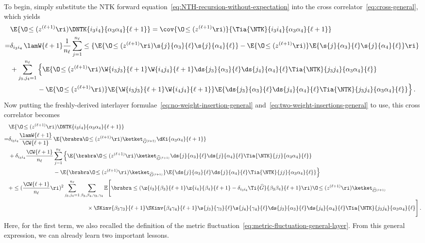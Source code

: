 To begin, simply substitute the NTK forward equation~\eqref{eq:NTH-recursion-without-expectation} into the cross correlator~\eqref{eq:cross-general}, which yields
\begin{align}\label{eq:cross-general-reexpress}
&\E{\O\!\le(z^{(\ell+1)}\ri)\DNTK{i_3i_4}{\alpha_3\alpha_4}{\ell+1}}=\cov{\O\!\le(z^{(\ell+1)}\ri)}{\Tia{\NTK}{i_3i_4}{\alpha_3\alpha_4}{\ell+1}}\, \\
=&\delta_{i_3i_4}\,\lamW{\ell+1}\frac{1}{n_{\ell}}\sum_{j=1}^{n_{\ell}}\le\{\E{\O\!\le(z^{(\ell+1)}\ri)\s{j}{\alpha_3}{\ell}\s{j}{\alpha_4}{\ell}}-\E{\O\!\le(z^{(\ell+1)}\ri)}\E{\s{j}{\alpha_3}{\ell}\s{j}{\alpha_4}{\ell}}\ri\}\, \nonumber\\
&+\sum_{j_3,j_4=1}^{n_{\ell}}\Big\{\E{\O\!\le(z^{(\ell+1)}\ri)\W{i_3j_3}{\ell+1}\W{i_4j_4}{\ell+1}\ds{j_3}{\alpha_3}{\ell}\ds{j_4}{\alpha_4}{\ell}\Tia{\NTK}{j_3j_4}{\alpha_3\alpha_4}{\ell}}\, \nonumber\\
&\quad \quad \quad \quad -\E{\O\!\le(z^{(\ell+1)}\ri)}\E{\W{i_3j_3}{\ell+1}\W{i_4j_4}{\ell+1}}\E{\ds{j_3}{\alpha_3}{\ell}\ds{j_4}{\alpha_4}{\ell}\Tia{\NTK}{j_3j_4}{\alpha_3\alpha_4}{\ell}}\Big\}\, .\nonumber
\end{align}
Now putting the freshly-derived interlayer formulae~\eqref{eq:no-weight-insertion-general} and~\eqref{eq:two-weight-insertions-general} to use,
this cross correlator becomes
\begin{align}\label{eq:cross-general-reexpress-II}
&\E{\O\!\le(z^{(\ell+1)}\ri)\DNTK{i_3i_4}{\alpha_3\alpha_4}{\ell+1}}\, \\
=&\delta_{i_3i_4}\frac{\lamW{\ell+1}}{\CW{\ell+1}}\,\E{\brabra\O\!\le(z^{(\ell+1)}\ri)\ketket_{\widehat{G}^{(\ell+1)}} \dKi{\alpha_3\alpha_4}{\ell+1}}\, \nonumber\\
&+\delta_{i_3i_4}\frac{\CW{\ell+1}}{n_{\ell}}\sum_{j=1}^{n_{\ell}}\Big\{\E{\brabra\O\!\le(z^{(\ell+1)}\ri)\ketket_{\widehat{G}^{(\ell+1)}}\ds{j}{\alpha_3}{\ell}\ds{j}{\alpha_4}{\ell}\Tia{\NTK}{jj}{\alpha_3\alpha_4}{\ell}}\, \nonumber\\
&\quad \quad \quad \quad \quad \quad \quad \quad -\E{\brabra\O\!\le(z^{(\ell+1)}\ri)\ketket_{\widehat{G}^{(\ell+1)}}}\E{\ds{j}{\alpha_3}{\ell}\ds{j}{\alpha_4}{\ell}\Tia{\NTK}{jj}{\alpha_3\alpha_4}{\ell}}\Big\}\, \nonumber\\
&+\le(\frac{\CW{\ell+1}}{n_{\ell}}\ri)^2\sum_{j_3,j_4=1}^{n_{\ell}}\sum_{\beta_3,\beta_4,\gamma_3,\gamma_4}\mathbb{E}\Bigg[\brabra\le(\z{i_3}{\beta_3}{\ell+1}\z{i_4}{\beta_4}{\ell+1}-\delta_{i_3i_4}\Ti{\widehat{G}}{\beta_3\beta_4}{\ell+1}\ri)\O\!\le(z^{(\ell+1)}\ri)\ketket_{\widehat{G}^{(\ell+1)}}\, \nonumber\\
&\quad \quad \quad \quad \quad \quad \quad \quad \quad \quad \quad \quad \quad \quad \times\SKinv{\beta_3\gamma_3}{\ell+1}\SKinv{\beta_4\gamma_4}{\ell+1}\s{j_3}{\gamma_3}{\ell}\s{j_4}{\gamma_4}{\ell}\ds{j_3}{\alpha_3}{\ell}\ds{j_4}{\alpha_4}{\ell}\Tia{\NTK}{j_3j_4}{\alpha_3\alpha_4}{\ell} \Bigg]\, .\nonumber
\end{align}
Here, for the first term, we also recalled the definition of the metric fluctuation~\eqref{eq:metric-fluctuation-general-layer}.
From this general expression, we can already learn two important lessons.

